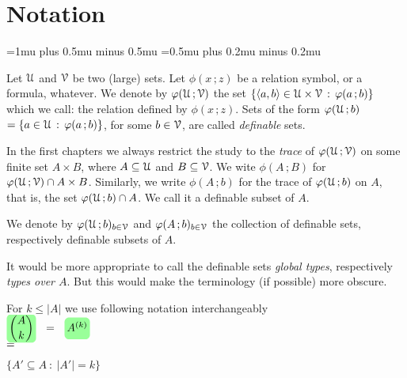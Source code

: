 \documentclass[scombinatorics.tex]{subfiles}
\begin{document}
\chapter*{Notation}

\label{minimax}


\def\medrel#1{\parbox[t]{6ex}{$\displaystyle\hfil #1$}}
\def\ceq#1#2#3{\parbox[t]{25ex}{$\displaystyle #1$}\medrel{#2}{$\displaystyle #3$}}

\thickmuskip=1mu plus 0.5mu minus 0.5mu
\medmuskip=0.5mu plus 0.2mu minus 0.2mu

Let $\EuScript U$ and $\EuScript V$ be two (large) sets.
Let $\phi(x\,;z)$ be a relation symbol, or a formula, whatever.
We denote by \emph{$\varphi(\EuScript U\,;\EuScript V)$\/} the set $\{\langle a,b\rangle\in\EuScript U\times\EuScript V\, :\, \varphi(a\,;b)\}$ which we call: the relation defined by $\phi(x\,;z)$.
Sets of the form \emph{$\varphi(\EuScript U\,;b)$}$=\{a\in\EuScript U\,:\, \varphi(a\,;b)\}$, for some $b\in\EuScript V$, are called \emph{definable\/} sets.


In the first chapters we always restrict the study to the \emph{trace\/} of $\varphi(\EuScript U\,;\EuScript V)$ on some finite set $A\times B$, where $A\subseteq\EuScript U$ and $B\subseteq\EuScript V$. 
We wite $\phi(A\,;B)$ for $\varphi(\EuScript U\,;\EuScript V)\cap A\times B$.
Similarly, we write $\phi(A\,;b)$ for the trace of $\varphi(\EuScript U\,;b)$ on $A$, that is, the set $\varphi(\EuScript U\,;b)\cap A$.
We call it a definable subset of $A$.

We denote by \emph{$\varphi(\EuScript U\,;b)_{b\in\EuScript V}$} and \emph{$\varphi(A\,;b)_{b\in\EuScript V}$} the collection of definable sets, respectively definable subsets of $A$.

It would be more appropriate to call the definable sets \textit{global types}, respectively \textit{types over $A$}.
But this would make the terminology (if possible) more obscure.

For $k\le|A|$ we use following notation interchangeably

\ceq{\hfill\emph{$\displaystyle{A\choose k}$}\medrel{=}\emph{$\vphantom{\Big[}A^{(k)}$}}
{=}
{\Big\{A'\subseteq A\ :\ |A'|=k \Big\}}
\end{document}
